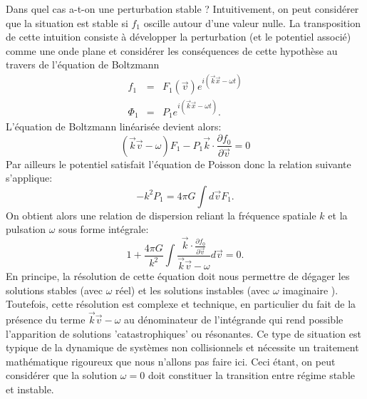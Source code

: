 Dans quel cas a-t-on une perturbation stable ? Intuitivement, on peut considérer que la situation est stable si $f_1$ oscille autour d'une valeur nulle. La transposition de cette intuition consiste à développer la perturbation (et le potentiel associé) comme une onde plane et considérer les conséquences de cette hypothèse au travers de l'équation de Boltzmann
\begin{eqnarray}
f_1&=&F_1(\vec{v})e^{i(\vec{k}\vec{x}-\omega t)}\\
\Phi_1&=&P_1e^{i(\vec{k}\vec{x}-\omega t)}.
\end{eqnarray}
L'équation de Boltzmann linéarisée devient alors:
\begin{equation}
(\vec{k}\vec{v}-\omega )F_1-P_1\vec{k}\cdot\frac{\partial f_0}{\partial \vec{v}}=0
\end{equation}
Par ailleurs le potentiel satisfait l'équation de Poisson donc la relation suivante s'applique:
\begin{equation}
-k^2 P_1=4\pi G \int d\vec{v} F_1.
\end{equation}
On obtient alors une relation de dispersion reliant la fréquence spatiale $k$ et la pulsation $\omega$ sous forme intégrale:
\begin{equation}
1+\frac{4\pi G}{k^2}\int \frac{\vec{k}\cdot\frac{\partial f_0}{\partial \vec{v}}}{\vec{k}\vec{v}-\omega}d\vec{v}=0.
\end{equation}
En principe, la résolution de cette équation doit nous permettre de dégager les solutions stables (avec $\omega$ réel) et les solutions instables (avec $\omega$ imaginaire ). Toutefois, cette résolution est complexe et technique, en particulier du fait de la présence du terme $\vec{k}\vec{v}-\omega$ au dénominateur de l'intégrande qui rend possible l'apparition de solutions 'catastrophiques' ou résonantes. Ce type de situation est typique de la dynamique de systèmes non collisionnels et nécessite un traitement mathématique rigoureux que nous n'allons pas faire ici. Ceci étant, on peut considérer que la solution $\omega=0$ doit constituer la transition entre régime stable et instable.

